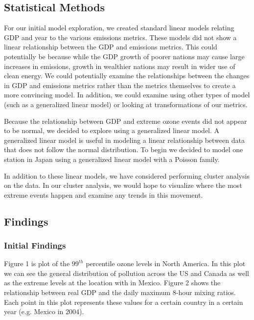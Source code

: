 \documentclass[11pt, oneside]{article}
\theoremstyle{definition}
\begin{document}
\subsection{Statistical Methods}

For our initial model exploration, we created standard linear models relating GDP and year to the various emissions metrics. These models did not show a linear relationship between the GDP and emissions metrics. This could potentially be because while the GDP growth of poorer nations may cause large increases in emissions, growth in wealthier nations may result in wider use of clean energy.  We could potentially examine the relationships between the changes in GDP and emissions metrics rather than the metrics themselves to create a more convincing model. In addition, we could examine using other types of model (such as a generalized linear model) or looking at transformations of our metrics.

Because the relationship between GDP and extreme ozone events did not appear to be normal, we decided to explore using a generalized linear model. A generalized linear model is useful in modeling a linear relationship between data that does not follow the normal distribution. To begin we decided to model one station in Japan using a generalized linear model with a Poisson family. 

In addition to these linear models, we have considered performing cluster analysis on the data. In our cluster analysis, we would hope to visualize where the most extreme events happen and examine any trends in this movement.




\subsection{Findings}
\subsubsection{Initial Findings}
Figure 1 is plot of the $99^{th}$ percentile ozone levels in North America. In this plot we can see the general distribution of pollution across the US and Canada as well as the extreme levels at the location with in Mexico. Figure 2 shows the relationship between real GDP and the daily maximum 8-hour mixing ratios. Each point in this plot represents these values for a certain country in a certain year (e.g. Mexico in 2004). 

\end{document}
